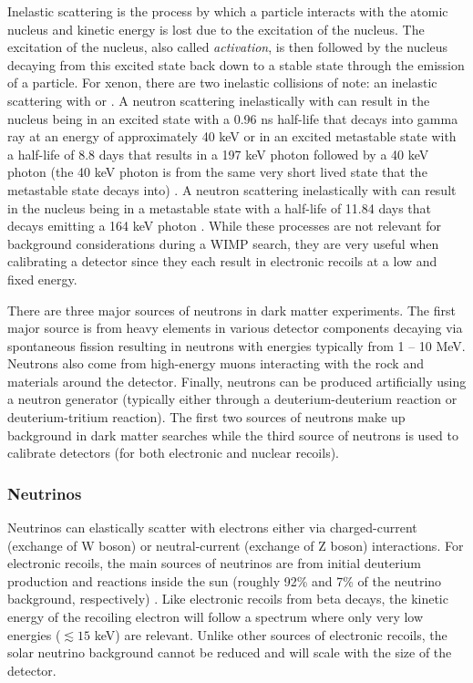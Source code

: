 Inelastic scattering is the process by which a particle interacts with the atomic nucleus and kinetic energy is lost due to the excitation of the nucleus.  The excitation of the nucleus, also called \textit{activation}, is then followed by the nucleus decaying from this excited state back down to a stable state through the emission of a particle.  For xenon, there are two inelastic collisions of note:  an inelastic scattering with  or .  A neutron scattering inelastically with  can result in the nucleus being in an excited state with a 0.96 ns half-life that decays into gamma ray at an energy of approximately 40 keV or in an excited metastable state with a half-life of 8.8 days that results in a 197 keV photon followed by a 40 keV photon (the 40 keV photon is from the same very short lived state that the metastable state decays into) \cite{timar2014nuclear}.  A neutron scattering inelastically with  can result in the nucleus being in a metastable state with a half-life of 11.84 days that decays emitting a 164 keV photon \cite{khazov2006nuclear}.   While these processes are not relevant for background considerations during a WIMP search, they are very useful when calibrating a detector since they each result in electronic recoils at a low and fixed energy.

There are three major sources of neutrons in dark matter experiments.  The first major source is from heavy elements in various detector components decaying via spontaneous fission resulting in neutrons with energies typically from 1 -- 10 MeV.  Neutrons also come from high-energy muons interacting with the rock and materials around the detector.  Finally, neutrons can be produced artificially using a neutron generator (typically either through a deuterium-deuterium reaction or deuterium-tritium reaction).  The first two sources of neutrons make up background in dark matter searches while the third source of neutrons is used to calibrate detectors (for both electronic and nuclear recoils).


\subsubsection{Neutrinos}


Neutrinos can elastically scatter with electrons either via charged-current (exchange of W boson) or neutral-current (exchange of Z boson) interactions.  For electronic recoils, the main sources of neutrinos are from initial deuterium production and  reactions inside the sun (roughly 92\% and 7\% of the neutrino background, respectively) \cite{aprile2016physics}.  Like electronic recoils from beta decays, the kinetic energy of the recoiling electron will follow a spectrum where only very low energies ($\lesssim 15$ keV) are relevant.  Unlike other sources of electronic recoils, the solar neutrino background cannot be reduced and will scale with the size of the detector.

